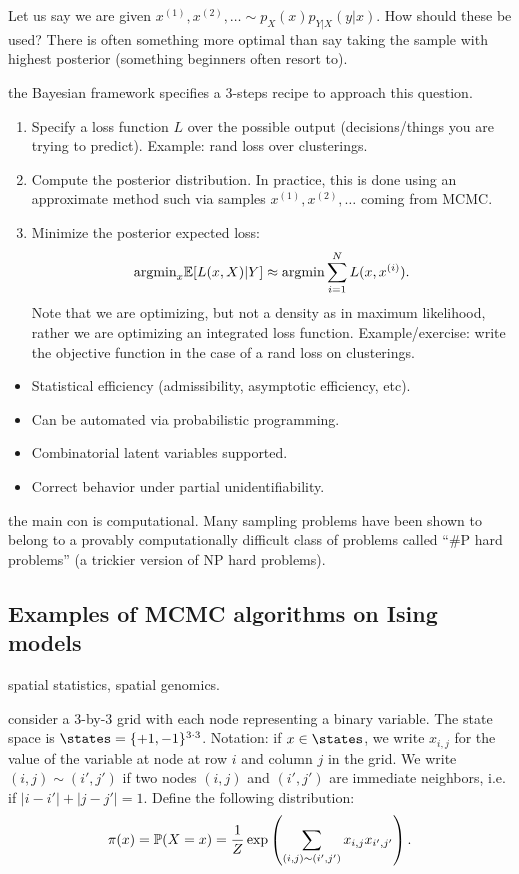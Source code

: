 \documentclass{article}
\begin{document}
Let us say we are given $x^{(1)}, x^{(2)}, \dots \sim p_X(x) p_{Y|X}(y|x)$. How should these be used? There is often something more optimal than say taking the sample with highest posterior (something beginners often resort to). 

 the Bayesian framework specifies a 3-steps recipe to approach this question.
\begin{enumerate}
  \item Specify a loss function $L$ over the possible output (decisions/things you are trying to predict). Example: rand loss over clusterings.
  \item Compute the posterior distribution. In practice, this is done using an approximate method such via samples $x^{(1)}, x^{(2)}, \dots$ coming from MCMC.
  \item Minimize the posterior expected loss:
\[ \text{argmin}_x \E[L(x, X)|Y] \approx \text{argmin} \sum_{i=1}^N L(x, x^{(i)}). \] Note that we are optimizing, but not a density as in maximum likelihood, rather we are optimizing an integrated loss function. Example/exercise: write the objective function in the case of a rand loss on clusterings.
\end{enumerate}

\begin{itemize}
  \item Statistical efficiency (admissibility, asymptotic efficiency, etc).
  \item Can be automated via probabilistic programming.
  \item Combinatorial latent variables supported.
  \item Correct behavior under partial unidentifiability.
\end{itemize}

 the main con is computational. Many sampling problems have been shown to belong to a provably computationally difficult class of problems called ``\#P hard problems'' (a trickier version of NP hard problems). 


\subsection{Examples of MCMC algorithms on Ising models}

 spatial statistics, spatial genomics.

 consider a 3-by-3 grid with each node representing a binary variable. The state space is $\states = \{+1, -1\}^{3\cdot 3}$. Notation: if $x \in \states$, we write $x_{i,j}$ for the value of the variable at node at row $i$ and column $j$ in the grid. We write $(i,j) \sim (i',j')$ if two nodes $(i,j)$ and $(i',j')$ are immediate neighbors, i.e. if $|i-i'| + |j-j'| = 1$. Define the following distribution:
\begin{equation}\label{eq:target}
\pi(x) = \P(X = x) = \frac{1}{Z} \exp\left( \sum_{(i,j)\sim(i',j')} x_{i,j} x_{i',j'} \right).
\end{equation}
\end{document}

